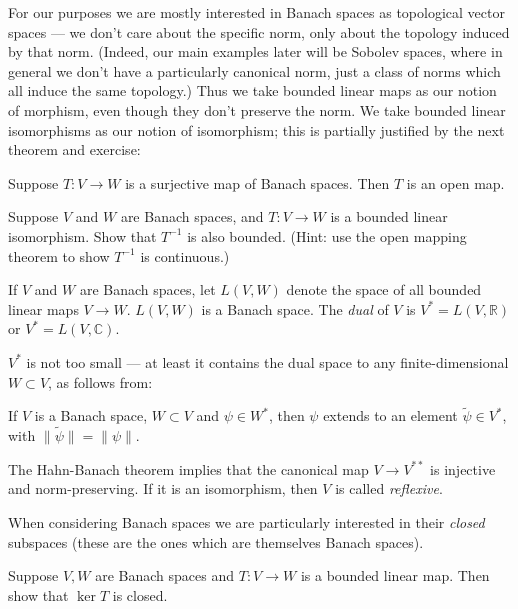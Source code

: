 \documentclass[12pt,letterpaper,reqno]{article}
\numberwithin{equation}{section}
\newcommand{\R}{\ensuremath{\mathbb R}}
\newcommand{\C}{\ensuremath{\mathbb C}}
\newcommand{\norm}[1]{\lVert#1\rVert}
\newcommand{\ti}[1]{\textit{#1}}
\begin{document}
For our purposes we are mostly interested in Banach spaces as topological
vector spaces --- we don't care about the specific norm,
only about the topology induced by that norm. (Indeed, our main examples
later will be Sobolev spaces, where in general we don't have a particularly
canonical norm, just a class of norms which all induce the same topology.)
Thus we take bounded linear maps as our notion of morphism,
even though they don't preserve the norm.
We take bounded linear isomorphisms as our notion of
isomorphism; this is partially justified by the next theorem
and exercise:

\begin{thm} Suppose $T: V \to W$ is a 
surjective map of Banach spaces. Then $T$ is an open map.
\end{thm}

\begin{exercise} Suppose $V$ and $W$ are Banach spaces, and $T: V \to W$ is a bounded linear isomorphism. Show that $T^{-1}$ is also bounded.
(Hint: use the open mapping theorem to show $T^{-1}$ is continuous.)
\end{exercise}

\begin{example} If $V$ and $W$ are Banach
spaces, let $L(V,W)$ denote the space of all bounded linear maps
$V \to W$. $L(V,W)$ is a Banach space. The \ti{dual} of $V$
is $V^* = L(V,\R)$ or $V^* = L(V,\C)$.
\end{example}

$V^*$ is not too small --- at least it contains the dual space to
any finite-dimensional $W \subset V$, as follows from:

\begin{thm} If $V$ is a Banach space, $W \subset V$
and $\psi \in W^*$, then $\psi$ extends to an element $\tilde\psi \in V^*$,
with $\norm{\tilde\psi} = \norm{\psi}$.
\end{thm}

The Hahn-Banach theorem implies that 
the canonical map $V \to V^{**}$ is injective and norm-preserving. 
If it is an isomorphism, then $V$ is called \ti{reflexive}.

When considering Banach spaces we are particularly interested in their
\ti{closed} subspaces (these are the ones which are themselves
Banach spaces). 

\begin{exercise} Suppose $V,W$ are Banach spaces and $T: V \to W$ is a
bounded linear map. Then show that $\ker T$ is closed.
\end{exercise}
\end{document}
